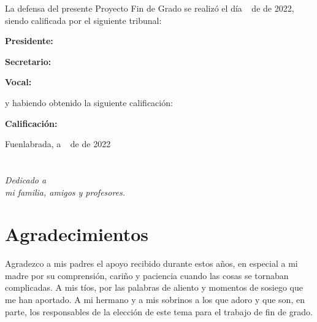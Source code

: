 \documentclass[a4paper, 12pt]{book}
\begin{document}
\vspace{1cm}
La defensa del presente Proyecto Fin de Grado se realizó el día \qquad$\;\,$ de \qquad\qquad\qquad\qquad \newline de 2022, siendo calificada por el siguiente tribunal:


\vspace{0.5cm}
\textbf{Presidente:}

\vspace{1.2cm}
\textbf{Secretario:}

\vspace{1.2cm}
\textbf{Vocal:}


\vspace{1.2cm}
y habiendo obtenido la siguiente calificación:

\vspace{1cm}
\textbf{Calificación:}


\vspace{1cm}
\begin{flushright}
Fuenlabrada, a \qquad$\;\,$ de \qquad\qquad\qquad\qquad de 2022
\end{flushright}


\chapter*{}
\begin{flushright}
\textit{Dedicado a \\
mi familia, amigos y profesores.}
\end{flushright}


\chapter*{Agradecimientos}

Agradezco a mis padres el apoyo recibido durante estos años, en especial a mi madre por su comprensión, cariño y paciencia cuando las cosas se tornaban complicadas. A mis tíos, por las palabras de aliento y momentos de sosiego que me han aportado. A mi hermano y a mis sobrinos a los que adoro y que son, en parte, los responsables de la elección de este tema para el trabajo de fin de grado. 
\end{document}
